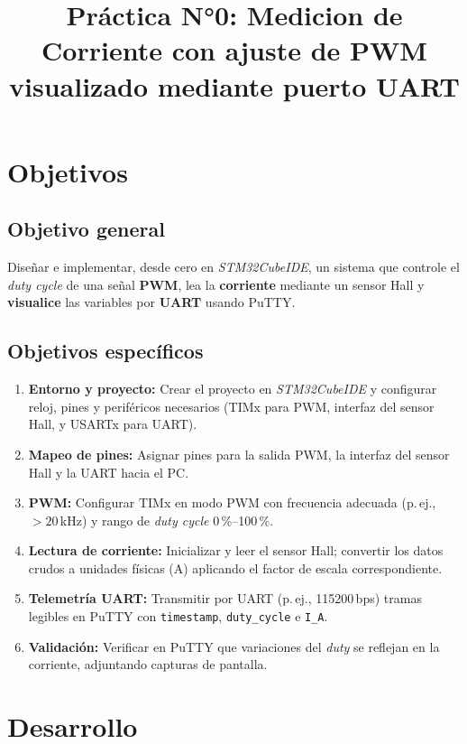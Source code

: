 \documentclass[a4paper,12pt]{article}
\title{Práctica N°0: Medicion de Corriente con ajuste de PWM visualizado mediante puerto UART}
\date{}
\begin{document}
\maketitle
\tableofcontents
\newpage


\section{Objetivos}

\subsection{Objetivo general}
Diseñar e implementar, desde cero en \textit{STM32CubeIDE}, un sistema que controle el \textit{duty cycle} de una señal \textbf{PWM}, lea la \textbf{corriente} mediante un sensor Hall y \textbf{visualice} las variables por \textbf{UART} usando PuTTY.

\subsection{Objetivos específicos}
\begin{enumerate}
  \item \textbf{Entorno y proyecto:} Crear el proyecto en \textit{STM32CubeIDE} y configurar reloj, pines y periféricos necesarios (TIMx para PWM, interfaz del sensor Hall, y USARTx para UART).
  \item \textbf{Mapeo de pines:} Asignar pines para la salida PWM, la interfaz del sensor Hall y la UART hacia el PC.
  \item \textbf{PWM:} Configurar TIMx en modo PWM con frecuencia adecuada (p.\,ej., $>20$\,kHz) y rango de \textit{duty cycle} 0\,\%–100\,\%.
  \item \textbf{Lectura de corriente:} Inicializar y leer el sensor Hall; convertir los datos crudos a unidades físicas (A) aplicando el factor de escala correspondiente.
  \item \textbf{Telemetría UART:} Transmitir por UART (p.\,ej., 115200\,bps) tramas legibles en PuTTY con \texttt{timestamp}, \texttt{duty\_cycle} e \texttt{I\_A}.
  \item \textbf{Validación:} Verificar en PuTTY que variaciones del \textit{duty} se reflejan en la corriente, adjuntando capturas de pantalla.
\end{enumerate}



\section{Desarrollo}
\end{document}

